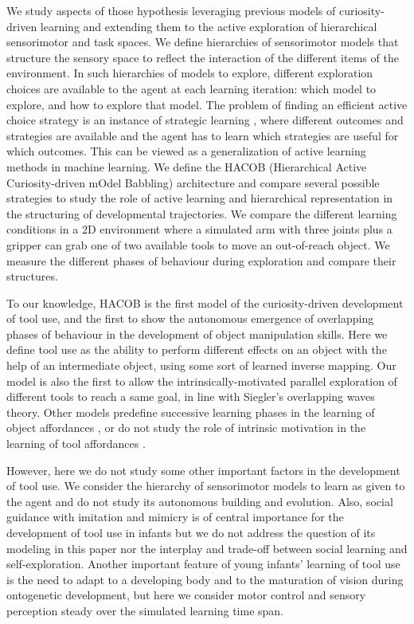 \documentclass[10pt,letterpaper]{article}
\begin{document}
	We study aspects of those hypothesis leveraging previous models of curiosity-driven learning and extending them to the active exploration of hierarchical sensorimotor and task spaces.
	We define hierarchies of sensorimotor models that structure the sensory space to reflect the interaction of the different items of the environment.
	In such hierarchies of models to explore, different exploration choices are available to the agent at each learning iteration: which model to explore, and how to explore that model.
	The problem of finding an efficient active choice strategy is an instance of strategic learning \cite{nguyen2012}, 
	where different outcomes and strategies are available and the agent has to learn which strategies are useful for which outcomes. 
	This can be viewed as a generalization of active learning methods in machine learning.
	We define the HACOB (Hierarchical Active Curiosity-driven mOdel Babbling) architecture and compare several possible strategies 
	to study the role of active learning and hierarchical representation in the structuring of developmental trajectories.
	We compare the different learning conditions in a $2$D environment where a simulated arm with three joints plus a gripper can grab one of two available tools to move an out-of-reach object.
	We measure the different phases of behaviour during exploration and compare their structures.
	
	To our knowledge, HACOB is the first model of the curiosity-driven development of tool use, 
	and the first to show the autonomous emergence of overlapping phases of behaviour in the development of object manipulation skills.
	Here we define  tool use as the ability to perform different effects on an object with the help of an intermediate object, using some sort of learned inverse mapping.
	Our model is also the first to allow the intrinsically-motivated parallel exploration of different tools to reach a same goal, in line with Siegler's overlapping waves theory.
	Other models predefine successive learning phases in the learning of object affordances \cite{ugur2015}, or do not study the role of intrinsic motivation in the learning of tool affordances \cite{stoytchev2005behavior}.
	
	However, here we do not study some other important factors in the development of tool use.
	We consider the hierarchy of sensorimotor models to learn as given to the agent and do not study its autonomous building and evolution.
	Also, social guidance with imitation and mimicry is of central importance for the development of tool use in infants but we do not address the question
	of its modeling in this paper nor the interplay and trade-off between social learning and self-exploration.
	Another important feature of young infants' learning of tool use is the need to adapt to a developing body and to the maturation of vision during ontogenetic development, 
	but here we consider motor control and sensory perception steady over the simulated learning time span.
\end{document}
